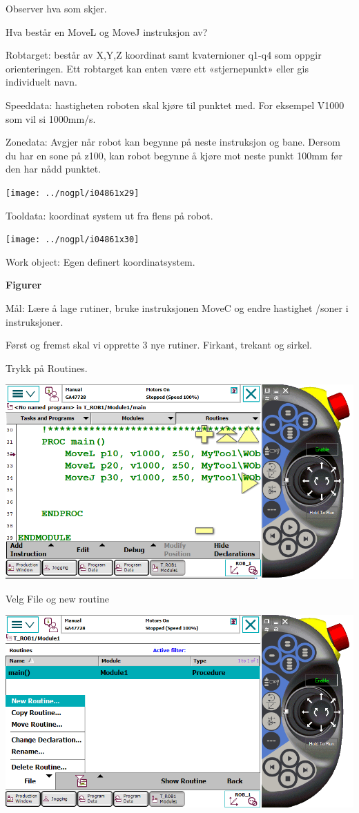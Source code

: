 Observer hva som skjer.

Hva består en MoveL og MoveJ instruksjon av? 

Robtarget: består av X,Y,Z koordinat samt kvaternioner q1-q4 som oppgir
orienteringen. Ett robtarget kan enten være ett «stjernepunkt» eller
gis individuelt navn. 

Speeddata: hastigheten roboten skal kjøre til punktet med. For eksempel
V1000 som vil si 1000mm/s. 

Zonedata: Avgjer når robot kan begynne på neste instruksjon og bane.
Dersom du har en sone på z100, kan robot begynne å kjøre mot neste
punkt 100mm før den har nådd punktet. 

\texttt{[image: ../nogpl/i04861x29]}

Tooldata: koordinat system ut fra flens på robot.

\texttt{[image: ../nogpl/i04861x30]}

Work object: Egen definert koordinatsystem.

\textbf{Figurer}

Mål: Lære å lage rutiner, bruke instruksjonen MoveC og endre hastighet
/soner i instruksjoner. 

Først og fremst skal vi opprette 3 nye rutiner. Firkant, trekant og
sirkel. 

Trykk på Routines. 

\includegraphics[width=1\textwidth]{i04861x31}

Velg File og new routine 

\includegraphics[width=1\textwidth]{i04861x32}

